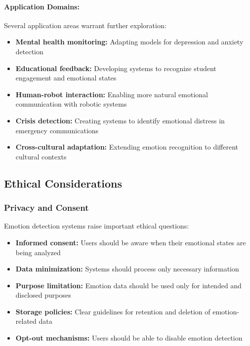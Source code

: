 \documentclass[12pt]{article}
\begin{document}
\paragraph{Application Domains:}
Several application areas warrant further exploration:

\begin{itemize}
    \item \textbf{Mental health monitoring:} Adapting models for depression and anxiety detection
    
    \item \textbf{Educational feedback:} Developing systems to recognize student engagement and emotional states
    
    \item \textbf{Human-robot interaction:} Enabling more natural emotional communication with robotic systems
    
    \item \textbf{Crisis detection:} Creating systems to identify emotional distress in emergency communications
    
    \item \textbf{Cross-cultural adaptation:} Extending emotion recognition to different cultural contexts
\end{itemize}

\subsection{Ethical Considerations}
\subsubsection{Privacy and Consent}
Emotion detection systems raise important ethical questions:

\begin{itemize}
    \item \textbf{Informed consent:} Users should be aware when their emotional states are being analyzed
    
    \item \textbf{Data minimization:} Systems should process only necessary information
    
    \item \textbf{Purpose limitation:} Emotion data should be used only for intended and disclosed purposes
    
    \item \textbf{Storage policies:} Clear guidelines for retention and deletion of emotion-related data
    
    \item \textbf{Opt-out mechanisms:} Users should be able to disable emotion detection
\end{itemize}
\end{document}
